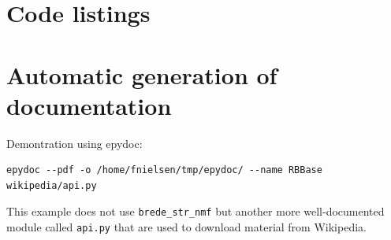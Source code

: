 \documentclass[10pt]{IEEEtran}
\begin{document}




\clearpage
\onecolumn
\appendices
\section{Code listings}

\lstlistoflistings




\newpage
\section{Automatic generation of documentation}

Demontration using epydoc:
\begin{verbatim}
epydoc --pdf -o /home/fnielsen/tmp/epydoc/ --name RBBase wikipedia/api.py
\end{verbatim}
This example does not use \verb!brede_str_nmf! but another more
well-documented module called {\tt api.py} that are used to download
material from Wikipedia. 


\end{document}
